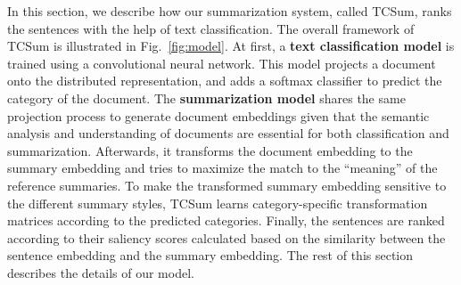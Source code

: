 \documentclass[letterpaper]{article}
\begin{document}


In this section, we describe how our summarization system, called TCSum, ranks the sentences with the help of text classification.
The overall framework of TCSum is illustrated in Fig.~\ref{fig:model}.
At first, a \textbf{text classification model} is trained using a convolutional neural network.
This model projects a document onto the distributed representation, and adds a softmax classifier to predict the category of the document.
The \textbf{summarization model} shares the same projection process to generate document embeddings given that the semantic analysis and understanding of documents are essential for both classification and summarization.
Afterwards, it transforms the document embedding to the summary embedding and tries to maximize the match to the ``meaning'' of the reference summaries.
To make the transformed summary embedding sensitive to the different summary styles, TCSum learns category-specific transformation matrices according to the predicted categories.
Finally, the sentences are ranked according to their saliency scores calculated based on the similarity between the sentence embedding and the summary embedding.
The rest of this section describes the details of our model.

\end{document}
